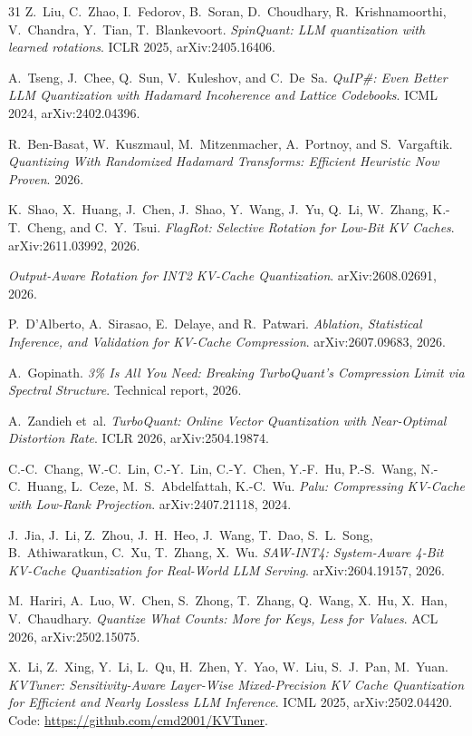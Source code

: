 \documentclass[10pt,twocolumn]{article}
\begin{document}
\begin{thebibliography}{31}
Z.~Liu, C.~Zhao, I.~Fedorov, B.~Soran, D.~Choudhary, R.~Krishnamoorthi, V.~Chandra, Y.~Tian, T.~Blankevoort.
\emph{SpinQuant: LLM quantization with learned rotations}.
ICLR 2025, arXiv:2405.16406.

A.~Tseng, J.~Chee, Q.~Sun, V.~Kuleshov, and C.~De~Sa.
\emph{QuIP\#: Even Better LLM Quantization with Hadamard Incoherence and Lattice Codebooks}.
ICML 2024, arXiv:2402.04396.

R.~Ben-Basat, W.~Kuszmaul, M.~Mitzenmacher, A.~Portnoy, and S.~Vargaftik.
\emph{Quantizing With Randomized Hadamard Transforms: Efficient Heuristic Now Proven}.
2026.

K.~Shao, X.~Huang, J.~Chen, J.~Shao, Y.~Wang, J.~Yu, Q.~Li, W.~Zhang, K.-T.~Cheng, and C.~Y.~Tsui.
\emph{FlagRot: Selective Rotation for Low-Bit KV Caches}.
arXiv:2611.03992, 2026.

\emph{Output-Aware Rotation for INT2 KV-Cache Quantization}.
arXiv:2608.02691, 2026.

P.~D'Alberto, A.~Sirasao, E.~Delaye, and R.~Patwari.
\emph{Ablation, Statistical Inference, and Validation for KV-Cache Compression}.
arXiv:2607.09683, 2026.

A.~Gopinath.
\emph{3\% Is All You Need: Breaking TurboQuant's Compression Limit via Spectral Structure}.
Technical report, 2026.

A.~Zandieh et~al.
\emph{TurboQuant: Online Vector Quantization with Near-Optimal Distortion Rate}.
ICLR 2026, arXiv:2504.19874.

C.-C.~Chang, W.-C.~Lin, C.-Y.~Lin, C.-Y.~Chen, Y.-F.~Hu, P.-S.~Wang, N.-C.~Huang, L.~Ceze, M.~S.~Abdelfattah, K.-C.~Wu.
\emph{Palu: Compressing KV-Cache with Low-Rank Projection}.
arXiv:2407.21118, 2024.

J.~Jia, J.~Li, Z.~Zhou, J.~H.~Heo, J.~Wang, T.~Dao, S.~L.~Song, B.~Athiwaratkun, C.~Xu, T.~Zhang, X.~Wu.
\emph{SAW-INT4: System-Aware 4-Bit KV-Cache Quantization for Real-World LLM Serving}.
arXiv:2604.19157, 2026.

M.~Hariri, A.~Luo, W.~Chen, S.~Zhong, T.~Zhang, Q.~Wang, X.~Hu, X.~Han, V.~Chaudhary.
\emph{Quantize What Counts: More for Keys, Less for Values}.
ACL 2026, arXiv:2502.15075.

X.~Li, Z.~Xing, Y.~Li, L.~Qu, H.~Zhen, Y.~Yao, W.~Liu, S.~J.~Pan, M.~Yuan.
\emph{KVTuner: Sensitivity-Aware Layer-Wise Mixed-Precision KV Cache Quantization for Efficient and Nearly Lossless LLM Inference}.
ICML 2025, arXiv:2502.04420. Code: \url{https://github.com/cmd2001/KVTuner}.


\end{thebibliography}
\end{document}

